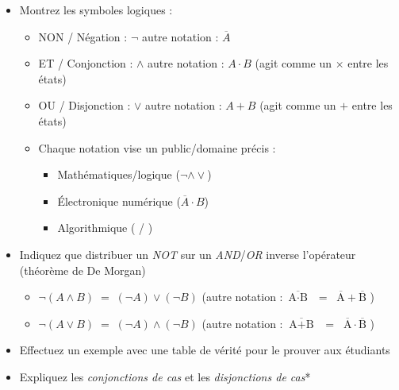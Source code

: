 \documentclass[11pt,a4paper]{article}
\begin{document}
\begin{itemize}
\item Montrez les symboles logiques :
  \begin{itemize}[label=$\bullet$]
  \item NON / Négation : $ \neg $  \hspace*{2cm}  autre notation : $ \overline{A} $
  \item ET / Conjonction : $ \wedge $  \hspace*{2cm}  autre notation : $ A \cdot B $ (agit comme un $ \times $ entre les états)
  \item OU / Disjonction : $ \vee $  \hspace*{2cm}  autre notation : $ A + B $ (agit comme un $ + $ entre les états)
  \item Chaque notation vise un public/domaine précis :
    \begin{itemize}[label=]
    \item Mathématiques/logique ($ \neg \wedge \vee $)
    \item \'Electronique numérique ($ \overline{A} \cdot B $)
    \item Algorithmique ( \hspace*{0.1cm} / \hspace*{0.1cm} \TTBF{\&\& ||})
    \end{itemize}
  \end{itemize}
\item Indiquez que distribuer un \textit{NOT} sur un \textit{AND}/\textit{OR} inverse l'opérateur (théorème de De Morgan)
  \begin{itemize}[label=$\bullet$]
  \item $ \neg ( A \wedge B ) \; = \; ( \neg A ) \vee ( \neg B ) $  \hspace*{2cm} (autre notation : $ \overline{\text{A} \cdot \text{B}} \; \; = \; \; \overline{\text{A}} + \overline{\text{B}} $ )
  \item $ \neg ( A \vee B )   \; = \; ( \neg A ) \wedge ( \neg B ) $  \hspace*{2cm}  (autre notation : $ \overline{\text{A} + \text{B}} \; \; = \; \; \overline{\text{A}} \cdot \overline{\text{B}} $ )
  \end{itemize}
\item Effectuez un exemple avec une table de vérité pour le prouver aux étudiants
\item Expliquez les \textit{conjonctions de cas} et les \textit{disjonctions de cas}*
  \begin{itemize}[label=$\bullet$]

\end{itemize}
\end{itemize}
\end{document}
